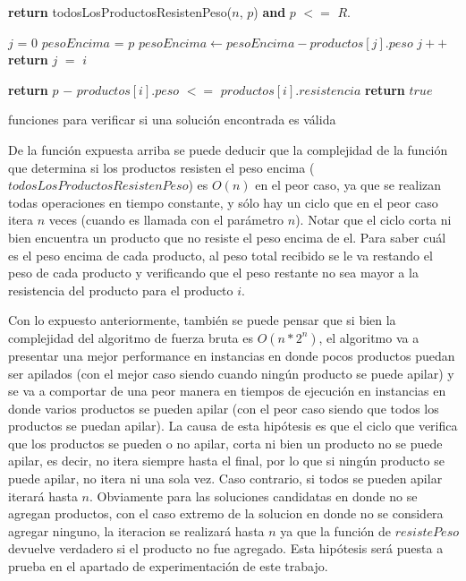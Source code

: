 \documentclass[10pt,a4paper]{article}
\begin{document}
\begin{algorithm}
\begin{algorithmic}[1]
    \State \textbf{return} todosLosProductosResistenPeso($n$, $p$) \textbf{and} $p$ $<=$ $R$.
\EndFunction

    \State $j$ = $0$
    \State $pesoEncima$ = $p$
     
            \State $pesoEncima \gets pesoEncima - productos[j].peso$
        \EndIf
        \State $j++$
    \EndWhile
    \State \textbf{return} $j$ $=$ $i$
\EndFunction

            \State \textbf{return} $p$ $-$ $productos[i].peso$ $<=$ $productos[i].resistencia$
        \EndIf 
    \State \textbf{return} $true$
\EndFunction

\end{algorithmic}
\caption{funciones para verificar si una solución encontrada es válida}
\end{algorithm}

De la función expuesta arriba se puede deducir que la complejidad de la función que determina si los productos resisten el peso encima ($todosLosProductosResistenPeso$) es $O(n)$ en el peor caso, ya que se realizan todas operaciones en tiempo constante, y sólo hay un ciclo que en el peor caso itera $n$ veces (cuando es llamada con el parámetro $n$). Notar que el ciclo corta ni bien encuentra un producto que no resiste el peso encima de el. Para saber cuál es el peso encima de cada producto, al peso total recibido se le va restando el peso de cada producto y verificando que el peso restante no sea mayor a la resistencia del producto para el producto $i$. 

Con lo expuesto anteriormente, también se puede pensar que si bien la complejidad del algoritmo de fuerza bruta es $O(n*2^n)$, el algoritmo va a presentar una mejor performance en instancias en donde pocos productos puedan ser apilados (con el mejor caso siendo cuando ningún producto se puede apilar) y se va a comportar de una peor manera en tiempos de ejecución en instancias en donde varios productos se pueden apilar (con el peor caso siendo que todos los productos se puedan apilar). La causa de esta hipótesis es que el ciclo que verifica que los productos se pueden o no apilar, corta ni bien un producto no se puede apilar, es decir, no itera siempre hasta el final, por lo que si ningún producto se puede apilar, no itera ni una sola vez. Caso contrario, si todos se pueden apilar iterará hasta $n$. Obviamente para las soluciones candidatas en donde no se agregan productos, con el caso extremo de la solucion en donde no se considera agregar ninguno, la iteracion se realizará hasta $n$ ya que la función de $resistePeso$ devuelve verdadero si el producto no fue agregado. Esta hipótesis será puesta a prueba en el apartado de experimentación de este trabajo.
\end{document}

